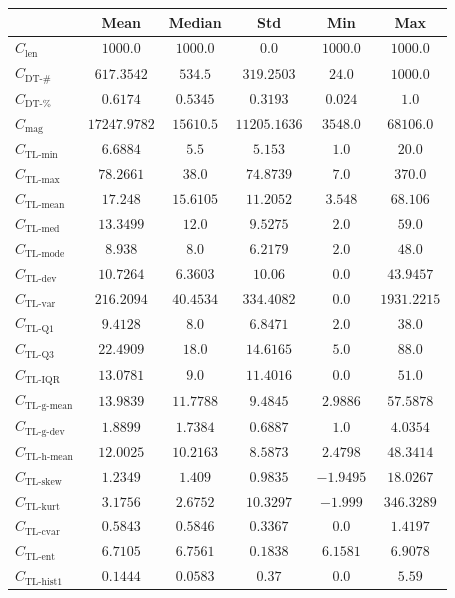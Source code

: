 \documentclass{standalone}
\newcommand{\magnitudename}{\text{mag}}
\newcommand{\magnitude}{C_{\magnitudename}}
\newcommand{\lengthname}{\text{len}}
\newcommand{\length}{C_{\lengthname}}
\newcommand{\tlminname}{\text{TL-min}}
\newcommand{\tlmin}{C_{\tlminname}}
\newcommand{\tlavgname}{\text{TL-mean}}
\newcommand{\tlavg}{C_{\tlavgname}}
\newcommand{\tlmaxname}{\text{TL-max}}
\newcommand{\tlmax}{C_{\tlmaxname}}
\newcommand{\tlmedname}{\text{TL-med}}
\newcommand{\tlmed}{C_{\tlmedname}}
\newcommand{\tlmodename}{\text{TL-mode}}
\newcommand{\tlmode}{C_{\tlmodename}}
\newcommand{\tldevname}{\text{TL-dev}}
\newcommand{\tldev}{C_{\tldevname}}
\newcommand{\tlvarname}{\text{TL-var}}
\newcommand{\tlvar}{C_{\tlvarname}}
\newcommand{\tlqonename}{\text{TL-Q1}}
\newcommand{\tlqone}{C_{\tlqonename}}
\newcommand{\tlqthreename}{\text{TL-Q3}}
\newcommand{\tlqthree}{C_{\tlqthreename}}
\newcommand{\tliqrname}{\text{TL-IQR}}
\newcommand{\tliqr}{C_{\tliqrname}}
\newcommand{\tlgmeanname}{\text{TL-g-mean}}
\newcommand{\tlgmean}{C_{\tlgmeanname}}
\newcommand{\tlgdevname}{\text{TL-g-dev}}
\newcommand{\tlgdev}{C_{\tlgdevname}}
\newcommand{\tlhmeanname}{\text{TL-h-mean}}
\newcommand{\tlhmean}{C_{\tlhmeanname}}
\newcommand{\tlskewnessname}{\text{TL-skew}}
\newcommand{\tlskewness}{C_{\tlskewnessname}}
\newcommand{\tlkurtosisname}{\text{TL-kurt}}
\newcommand{\tlkurtosis}{C_{\tlkurtosisname}}
\newcommand{\tlcvariationname}{\text{TL-cvar}}
\newcommand{\tlcvariation}{C_{\tlcvariationname}}
\newcommand{\tlentropyname}{\text{TL-ent}}
\newcommand{\tlentropy}{C_{\tlentropyname}}
\newcommand{\tlhistonename}{\text{TL-hist1}}
\newcommand{\tlhistone}{C_{\tlhistonename}}
\newcommand{\numberuniquetracesname}{\text{DT-\#}}
\newcommand{\numberuniquetraces}{C_{\numberuniquetracesname}}
\newcommand{\percentageuniquetracesname}{\text{DT-\%}}
\newcommand{\percentageuniquetraces}{C_{\percentageuniquetracesname}}
\begin{document}
\begin{tabular}{lccccc} \toprule 
 & \textbf{Mean} & \textbf{Median} & \textbf{Std} & \textbf{Min} & \textbf{Max} \\ \midrule 
$\length$ & $1000.0$ & $1000.0$ & $0.0$ & $1000.0$ & $1000.0$ \\ 
$\numberuniquetraces$ & $617.3542$ & $534.5$ & $319.2503$ & $24.0$ & $1000.0$ \\ 
$\percentageuniquetraces$ & $0.6174$ & $0.5345$ & $0.3193$ & $0.024$ & $1.0$ \\ 
$\magnitude$ & $17247.9782$ & $15610.5$ & $11205.1636$ & $3548.0$ & $68106.0$ \\ 
$\tlmin$ & $6.6884$ & $5.5$ & $5.153$ & $1.0$ & $20.0$ \\ 
$\tlmax$ & $78.2661$ & $38.0$ & $74.8739$ & $7.0$ & $370.0$ \\ 
$\tlavg$ & $17.248$ & $15.6105$ & $11.2052$ & $3.548$ & $68.106$ \\ 
$\tlmed$ & $13.3499$ & $12.0$ & $9.5275$ & $2.0$ & $59.0$ \\ 
$\tlmode$ & $8.938$ & $8.0$ & $6.2179$ & $2.0$ & $48.0$ \\ 
$\tldev$ & $10.7264$ & $6.3603$ & $10.06$ & $0.0$ & $43.9457$ \\ 
$\tlvar$ & $216.2094$ & $40.4534$ & $334.4082$ & $0.0$ & $1931.2215$ \\ 
$\tlqone$ & $9.4128$ & $8.0$ & $6.8471$ & $2.0$ & $38.0$ \\ 
$\tlqthree$ & $22.4909$ & $18.0$ & $14.6165$ & $5.0$ & $88.0$ \\ 
$\tliqr$ & $13.0781$ & $9.0$ & $11.4016$ & $0.0$ & $51.0$ \\ 
$\tlgmean$ & $13.9839$ & $11.7788$ & $9.4845$ & $2.9886$ & $57.5878$ \\ 
$\tlgdev$ & $1.8899$ & $1.7384$ & $0.6887$ & $1.0$ & $4.0354$ \\ 
$\tlhmean$ & $12.0025$ & $10.2163$ & $8.5873$ & $2.4798$ & $48.3414$ \\ 
$\tlskewness$ & $1.2349$ & $1.409$ & $0.9835$ & $-1.9495$ & $18.0267$ \\ 
$\tlkurtosis$ & $3.1756$ & $2.6752$ & $10.3297$ & $-1.999$ & $346.3289$ \\ 
$\tlcvariation$ & $0.5843$ & $0.5846$ & $0.3367$ & $0.0$ & $1.4197$ \\ 
$\tlentropy$ & $6.7105$ & $6.7561$ & $0.1838$ & $6.1581$ & $6.9078$ \\ 
$\tlhistone$ & $0.1444$ & $0.0583$ & $0.37$ & $0.0$ & $5.59$ \\ 

\end{tabular}
\end{document}
